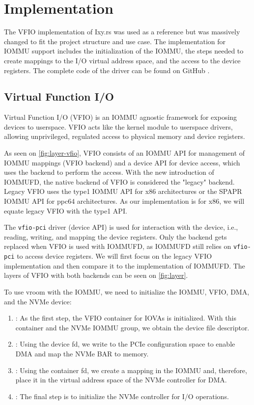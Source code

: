 \chapter{Implementation} \label{c:impl}

The VFIO implementation of Ixy.rs \cite{ixy.rs} was used as a reference but was massively changed to fit the project structure and use case. The implementation for IOMMU support includes the initialization of the IOMMU, the steps needed to create mappings to the I/O virtual address space, and the access to the device registers. The complete code of the driver can be found on GitHub \cite{vroomsource}.

\section{Virtual Function I/O}
Virtual Function I/O (VFIO) is an IOMMU agnostic framework for exposing devices to userspace. VFIO acts like the kernel module to userspace drivers, allowing unprivileged, regulated access to physical memory and device registers.

As seen on \autoref{fig:layer-vfio}, VFIO consists of an IOMMU API for management of IOMMU mappings (VFIO backend) and a device API for device access, which uses the backend to perform the access. With the new introduction of IOMMUFD, the native backend of VFIO is considered the "legacy" backend. Legacy VFIO uses the type1 IOMMU API for x86 architectures or the SPAPR IOMMU API for ppc64 architectures. As our implementation is for x86, we will equate legacy VFIO with the type1 API.

The \texttt{vfio-pci} driver (device API) is used for interaction with the device, i.e., reading, writing, and mapping the device registers. Only the backend gets replaced when VFIO is used with IOMMUFD, as IOMMUFD still relies on \texttt{vfio-pci} to access device registers. We will first focus on the legacy VFIO implementation and then compare it to the implementation of IOMMUFD.
The layers of VFIO with both backends can be seen on \autoref{fig:layer}.

To use vroom with the IOMMU, we need to initialize the IOMMU, VFIO, DMA, and the NVMe device:
\begin{enumerate}
    \item \textbf{}: As the first step, the VFIO container for IOVAs is initialized. With this container and the NVMe IOMMU group, we obtain the device file descriptor.
    \item \textbf{}: Using the device fd, we write to the PCIe configuration space to enable DMA and map the NVMe BAR to memory.
    \item \textbf{}: Using the container fd, we create a mapping in the IOMMU and, therefore, place it in the virtual address space of the NVMe controller for DMA.
    \item \textbf{}: The final step is to initialize the NVMe controller for I/O operations.
\end{enumerate}

